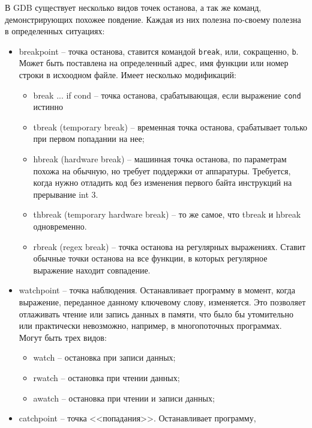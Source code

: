 В GDB существует несколько видов точек останова, а так же команд, 
демонстрирующих похожее повдение. 
Каждая из них полезна по-своему полезна в определенных ситуациях:
\begin{itemize}
    \item breakpoint -- точка останова, ставится командой \verb|break|,
        или, сокращенно, \verb|b|. Может быть поставлена на определенный
        адрес, имя функции или номер строки в исхоодном файле.
        Имеет несколько модификаций:
        \begin{itemize}
            \item break ... if cond -- точка останова, срабатывающая,
                если выражение \verb|cond| истинно
            \item tbreak (temporary break) -- временная точка
                останова, срабатывает только при первом попадании на нее;
            \item hbreak (hardware break) -- машинная точка останова,
                по параметрам похожа на обычную, но требует поддержки
                от аппаратуры. Требуется, когда нужно отладить код
                без изменения первого байта инструкций на прерывание 
                int 3.
            \item thbreak (temporary hardware break) -- то же самое, что
                tbreak и hbreak одновременно.
            \item rbreak (regex break) -- точка останова на регулярных
                выражениях. Ставит обычные точки останова на все функции,
                в которых регулярное выражение находит совпадение.
        \end{itemize}
    \item watchpoint -- точка наблюдения. Останавливает программу в
        момент, когда выражение, переданное данному ключевому слову,
        изменяется. Это позволяет отлаживать чтение или запись данных в памяти,
        что было бы утомительно или практически невозможно, например,
        в многопоточных программах. Могут быть трех видов:
        \begin{itemize}
            \item watch -- остановка при записи данных;
            \item rwatch -- остановка при чтении данных;
            \item awatch -- остановка при чтении и записи данных;
        \end{itemize}
    \item catchpoint -- точка <<попадания>>. Останавливает программу,

\end{itemize}
